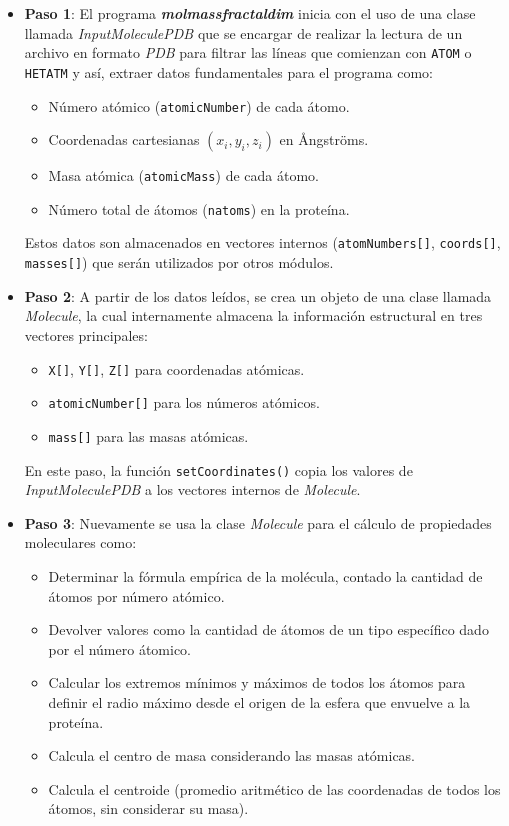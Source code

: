 	\begin{itemize}
		\item \textbf{Paso 1}:  El programa \textbf{\textit{molmassfractaldim}} inicia con el
		uso de una clase llamada \textit{InputMoleculePDB} que se encargar de realizar 
		la lectura de un archivo en formato \textit{PDB}  para filtrar las líneas que 
		comienzan con \texttt{ATOM} o \texttt{HETATM} y así, extraer datos 
		fundamentales para el programa como:  
		
		\begin{itemize}
			\item Número atómico (\texttt{atomicNumber}) de cada átomo.
			\item Coordenadas cartesianas \((x_i, y_i, z_i)\) en \AA ngstr\"oms.
			\item Masa atómica (\texttt{atomicMass}) de cada átomo.
			\item Número total de átomos (\texttt{natoms}) en la proteína.
		\end{itemize}
		Estos datos son almacenados en vectores internos (\texttt{atomNumbers[]}, \texttt{coords[]}, \texttt{masses[]}) 
		que serán utilizados por otros módulos.
	
		\item \textbf{Paso 2}: 	A partir de los datos leídos, se crea un objeto de una clase llamada \textit{Molecule},
		la cual internamente almacena la información estructural en tres vectores principales:
		
		\begin{itemize}
			\item \texttt{X[]}, \texttt{Y[]}, \texttt{Z[]} para coordenadas atómicas.
			\item \texttt{atomicNumber[]} para los números atómicos.
			\item \texttt{mass[]} para las masas atómicas.
		\end{itemize}
		

		En este paso, la función \texttt{setCoordinates()} copia los valores de \textit{InputMoleculePDB}
		 a los vectores internos de \textit{Molecule}.
		
		
		\item \textbf{Paso 3}: Nuevamente se usa la clase 
		\textit{Molecule} para el cálculo de propiedades moleculares como:
		
		\begin{itemize}
			\item Determinar la fórmula empírica de la molécula, contado la cantidad de átomos por número atómico.
			\item Devolver valores como la cantidad de átomos de un tipo específico 
			dado por el número átomico.
			\item Calcular los extremos mínimos y máximos de todos los átomos para definir 
			el radio máximo desde el origen de la esfera que envuelve a la proteína.
			\item Calcula el centro de masa considerando las masas atómicas.
			\item Calcula el centroide (promedio aritmético de las coordenadas de todos los
			átomos, sin considerar su masa).
		\end{itemize}
		

\end{itemize}
